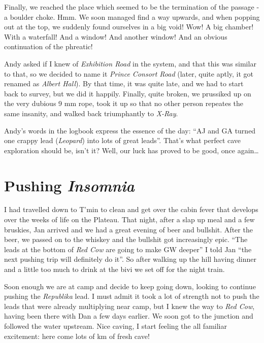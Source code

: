 Finally, we reached the place which seemed to be the termination of the
passage - a boulder choke. Hmm. We soon managed find a way upwards, and
when popping out at the top, we suddenly found ourselves in a big void!
Wow! A big chamber! With a waterfall! And a window! And another window!
And an obvious continuation of the phreatic!

Andy asked if I knew of \emph{Exhibition Road} in the system, and that
this was similar to that, so we decided to name it \emph{Prince Consort
Road} (later, quite aptly, it got renamed as \emph{Albert Hall}). By
that time, it was quite late, and we had to start back to survey, but we
did it happily. Finally, quite broken, we prussiked up on the very
dubious 9 mm rope, took it up so that no other person repeates the same
insanity, and walked back triumphantly to \emph{X-Ray}.

Andy's words in the logbook express the essence of the day: ``AJ and GA
turned one crappy lead (\emph{Leopard}) into lots of great leads''.
That's what perfect cave exploration should be, isn't it? Well, our luck
has proved to be good, once again\ldots{}



\section{\texorpdfstring{Pushing
\emph{Insomnia}}{Pushing Insomnia}}

I had travelled down to T'min to clean and get over the cabin fever that
develops over the weeks of life on the Plateau. That night, after a slap
up meal and a few bruskies, Jan arrived and we had a great evening of
beer and bullshit. After the beer, we passed on to the whiskey and the
bullshit got increasingly epic. ``The leads at the bottom of \emph{Red
Cow} are going to make GW deeper'' I told Jan ``the next pushing trip
will definitely do it''. So after walking up the hill having dinner and
a little too much to drink at the bivi we set off for the night train.

Soon enough we are at camp and decide to keep going down, looking to
continue pushing the \emph{Republika} lead. I must admit it took a lot
of strength not to push the leads that were already multiplying near
camp, but I knew the way to \emph{Red Cow}, having been there with Dan a
few days earlier. We soon got to the junction and followed the water
upstream. Nice caving, I start feeling the all familiar excitement: here
come lots of km of fresh cave!

